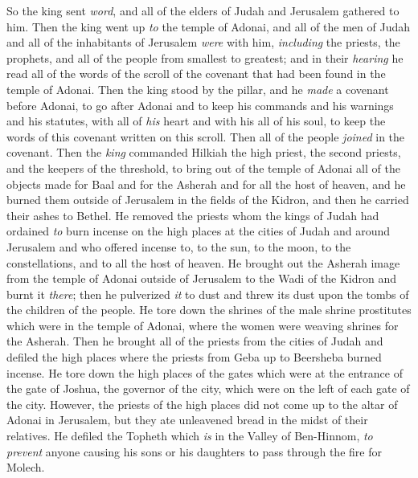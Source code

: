 \begin{biblechapter} %
 So the king sent \textit{word}, and all of the elders of Judah and Jerusalem gathered to him.
\verse Then the king went up \textit{to} the temple of Adonai, and all of the men of Judah and all of the inhabitants of Jerusalem \textit{were} with him, \textit{including} the priests, the prophets, and all of the people from smallest to greatest; and in their \textit{hearing} he read all of the words of the scroll of the covenant that had been found in the temple of Adonai.
\verse Then the king stood by the pillar, and he \textit{made} a covenant before Adonai, to go after Adonai and to keep his commands and his warnings and his statutes, with all of \textit{his} heart and with his all of his soul, to keep the words of this covenant written on this scroll. Then all of the people \textit{joined} in the covenant.
\verse Then the \textit{king} commanded Hilkiah the high priest, the second priests, and the keepers of the threshold, to bring out of the temple of Adonai all of the objects made for Baal and for the Asherah and for all the host of heaven, and he burned them outside of Jerusalem in the fields of the Kidron, and then he carried their ashes to Bethel.
\verse He removed the priests whom the kings of Judah had ordained \textit{to} burn incense on the high places at the cities of Judah and around Jerusalem and who offered incense to, to the sun, to the moon, to the constellations, and to all the host of heaven.
\verse He brought out the Asherah image from the temple of Adonai outside of Jerusalem to the Wadi of the Kidron and burnt it \textit{there}; then he pulverized \textit{it} to dust and threw its dust upon the tombs of the children of the people.
\verse He tore down the shrines of the male shrine prostitutes which were in the temple of Adonai, where the women were weaving shrines for the Asherah.
\verse Then he brought all of the priests from the cities of Judah and defiled the high places where the priests from Geba up to Beersheba burned incense. He tore down the high places of the gates which were at the entrance of the gate of Joshua, the governor of the city, which were on the left of each gate of the city.
\verse However, the priests of the high places did not come up to the altar of Adonai in Jerusalem, but they ate unleavened bread in the midst of their relatives.
\verse He defiled the Topheth which \textit{is} in the Valley of Ben-Hinnom, \textit{to prevent} anyone causing his sons or his daughters to pass through the fire for Molech.

\end{biblechapter}
